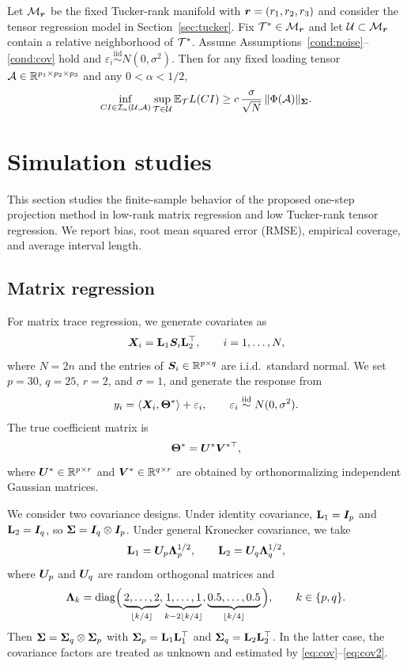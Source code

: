\documentclass[authoryear,preprint,review,12pt]{elsarticle}
\begin{document}
\begin{cor}\label{cor:ci_tensor_local}
	Let $\mathcal M_{\boldsymbol r}$ be the fixed Tucker-rank manifold with $\boldsymbol r=(r_1,r_2,r_3)$ and consider the tensor regression model in Section~\ref{sec:tucker}.
	Fix $\mathcal{T}^\ast\in\mathcal M_{\boldsymbol r}$ and let $\mathcal U\subset\mathcal M_{\boldsymbol r}$ contain a relative neighborhood of $\mathcal{T}^\ast$.
	Assume Assumptions~\ref{cond:noise}--\ref{cond:cov} hold and $\varepsilon_i\stackrel{\mathrm{iid}}{\sim}N(0,\sigma^2)$.
	Then for any fixed loading tensor $\mathcal{A}\in\mathbb R^{p_1\times p_2\times p_3}$ and any $0<\alpha<1/2$,
	\[
	\inf_{CI\in\mathcal I_\alpha(\mathcal U,\mathcal{A})}
	\sup_{\mathcal{T}\in\mathcal U}\mathbb E_{\mathcal{T}}L(CI)
	\ge
	c\,\frac{\sigma}{\sqrt N}\,\|\Phi(\mathcal{A})\|_{\mathbf{ \Sigma}}.
	\]
\end{cor}




\section{Simulation studies}\label{sec:simulation}
This section studies the finite-sample behavior of the proposed one-step projection method in low-rank matrix regression and low Tucker-rank tensor regression.
We report bias, root mean squared error (RMSE), empirical coverage, and average interval length.

\subsection{Matrix regression}
For matrix trace regression, we generate covariates as
\[
\boldsymbol X_i=\mathbf{L}_1\boldsymbol S_i\mathbf{L}_2^\top,\qquad i=1,\ldots,N,
\]
where $N=2n$ and the entries of $\boldsymbol S_i\in\mathbb R^{p\times q}$ are i.i.d.\ standard normal.
We set $p=30$, $q=25$, $r=2$, and $\sigma=1$, and generate the response from
\[
y_i=\langle \boldsymbol X_i,\mathbf{\Theta}^\ast\rangle+\varepsilon_i,
\qquad
\varepsilon_i\stackrel{\mathrm{iid}}{\sim}N(0,\sigma^2).
\]
The true coefficient matrix is
\[
\mathbf{\Theta}^\ast=\boldsymbol U^\ast\boldsymbol V^{\ast\top},
\]
where $\boldsymbol U^\ast\in\mathbb R^{p\times r}$ and $\boldsymbol V^\ast\in\mathbb R^{q\times r}$ are obtained by orthonormalizing independent Gaussian matrices.

We consider two covariance designs.
Under identity covariance, $\mathbf{L}_1=\boldsymbol I_p$ and $\mathbf{L}_2=\boldsymbol I_q$, so $\mathbf{ \Sigma}=\boldsymbol I_q\otimes \boldsymbol I_p$.
Under general Kronecker covariance, we take
\[
\mathbf{L}_1=\boldsymbol U_p\boldsymbol \Lambda_p^{1/2},
\qquad
\mathbf{L}_2=\boldsymbol U_q\boldsymbol \Lambda_q^{1/2},
\]
where $\boldsymbol U_p$ and $\boldsymbol U_q$ are random orthogonal matrices and
\begin{equation}
\boldsymbol \Lambda_k=\mathrm{diag}\Big(\underbrace{2,\ldots,2}_{\lfloor k/4\rfloor},
\underbrace{1,\ldots,1}_{k-2\lfloor k/4\rfloor},
\underbrace{0.5,\ldots,0.5}_{\lfloor k/4\rfloor}\Big),
\qquad k\in\{p,q\}.
\label{eq:simu}
\end{equation}
Then $\mathbf{ \Sigma}=\mathbf{ \Sigma}_q\otimes\mathbf{ \Sigma}_p$ with $\mathbf{ \Sigma}_p=\mathbf{L}_1\mathbf{L}_1^\top$ and $\mathbf{ \Sigma}_q=\mathbf{L}_2\mathbf{L}_2^\top$.
In the latter case, the covariance factors are treated as unknown and estimated by \eqref{eq:cov}--\eqref{eq:cov2}.
\end{document}
